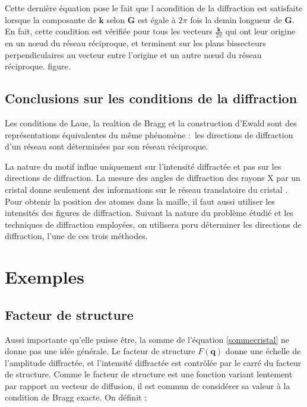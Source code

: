 Cette dernière équation pose le fait que l acondition de la diffraction est
satisfaite lorsque la composante de $\mathbf{k}$ selon $\mathbf{G}$ est égale à
$2\pi$ fois la demin longueur de $\mathbf{G}$. En fait, cette condition est
vérifiée pour tous les vecteurs $\frac{\mathbf{k}}{2\pi}$ qui ont leur origine
en un nœud du réseau réciproque, et terminent sur les plans bissecteurs
perpendiculaires au vecteur entre l'origine et un autre nœud du réseau réciproque. \TODO figure.


 
\subsection{Conclusions sur les conditions de la diffraction}

Les conditions de Laue, la realtion de Bragg et la construction d'Ewald sont des
représentations équivalentes du même phénomène : les directions de diffraction 
d'un réseau sont déterminées par son réseau réciproque.

La nature du motif influe uniquement sur l'intensité diffractée et pas sur les
directions de diffraction. La mesure des angles de diffraction des rayons X par
un cristal donne seulement des informations sur le réseau translatoire du cristal
. Pour obtenir la position des atomes dans la maille, il faut aussi utiliser les
intensités des figures de diffraction. Suivant la nature du problème étudié et
les techniques de diffraction employées, on utilisera poru déterminer les
directions de diffraction, l'une de ces trois méthodes.

\section{Exemples}

\subsection{Facteur de structure}

Aussi importante qu'elle puisse être, la somme de l'équation \ref{sommecristal}
ne donne pas une idée générale. Le facteur de structure $F(\mathbf{q})$ donne une
échelle de l'amplitude diffractée, et l'intensité diffractée est contrôlée
par le carré du facteur de structure. Comme le facteur de structure est une
fonction variant lentement par rapport au vecteur de diffusion, il est commun de
considérer sa valeur à la condition de Bragg exacte. On définit :

